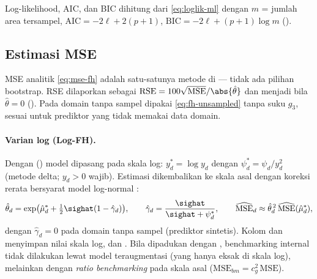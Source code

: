 Log-likelihood, AIC, dan BIC dihitung dari \eqref{eq:loglik-ml} dengan $m$
= jumlah area tersampel, $\mathrm{AIC}=-2\ell+2(p+1)$,
$\mathrm{BIC}=-2\ell+(p+1)\log m$ ().


\subsection{Estimasi MSE}\label{sec:fh-mse}

MSE analitik \eqref{eq:mse-fh} adalah satu-satunya metode di  --- tidak
ada pilihan bootstrap. RSE dilaporkan sebagai
$\mathrm{RSE}=100\sqrt{\mathrm{MSE}}/\abs{\hat\theta}$ dan menjadi
 bila $\hat\theta=0$ (). Pada domain tanpa
sampel dipakai \eqref{eq:fh-unsampled} tanpa suku $g_3$, sesuai
\citet{prasad1990estimation} untuk prediktor yang tidak memakai data domain.

\paragraph{Varian log (Log-FH).} Dengan 
() model dipasang pada skala log:
$y_d^\ast=\log y_d$ dengan $\psi_d^\ast=\psi_d/y_d^2$ (metode delta; $y_d>0$
wajib). Estimasi dikembalikan ke skala asal dengan koreksi rerata bersyarat
model log-normal \citep[tanpa suku $O(m^{-1})$ dari][]{slud2006mean}:
\begin{equation}
  \hat\theta_d=\exp\bigl(\hat\mu_d^\ast+\tfrac12\sighat(1-\hat\gamma_d)\bigr),
  \qquad \hat\gamma_d=\frac{\sighat}{\sighat+\psi_d^\ast},
  \qquad \widehat{\mathrm{MSE}}_d\approx\hat\theta_d^{\,2}\,\widehat{\mathrm{MSE}}(\hat\mu_d^\ast),
  \label{eq:fh-log}
\end{equation}
dengan $\hat\gamma_d=0$ pada domain tanpa sampel (prediktor sintetis).
Kolom  dan  menyimpan nilai skala log, dan
. Bila dipadukan dengan ,
benchmarking internal tidak dilakukan lewat model teraugmentasi (yang hanya
eksak di skala log), melainkan dengan \emph{ratio benchmarking} pada skala asal
($\mathrm{MSE}_{bm}=c_g^2\,\mathrm{MSE}$).

